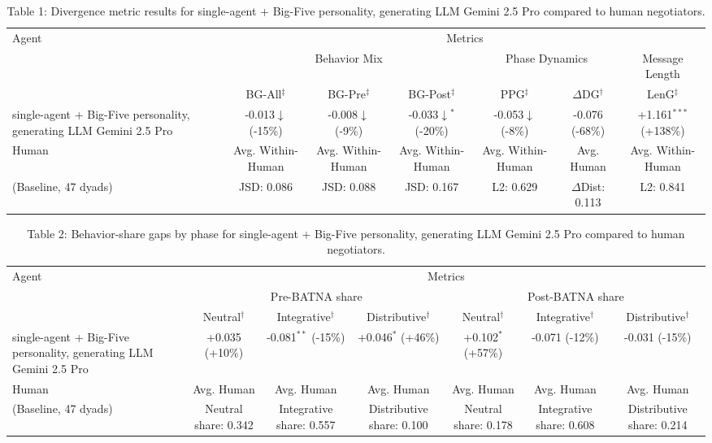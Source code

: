 \begin{table}[t]
\centering
\begin{tabular}{lcccccc}
\toprule
\multirow{3}{*}{Agent} & \multicolumn{6}{c}{Metrics} \\
\cmidrule(lr){2-7}
 & \multicolumn{3}{c}{Behavior Mix} & \multicolumn{2}{c}{Phase Dynamics} & \multicolumn{1}{c}{Message Length} \\
\cmidrule(lr){2-4} \cmidrule(lr){5-6} \cmidrule(lr){7-7}
 & BG-All$^\ddagger$ & BG-Pre$^\ddagger$ & BG-Post$^\ddagger$ & PPG$^\ddagger$ & $\Delta$DG$^\dagger$ & LenG$^\ddagger$ \\
\midrule
single-agent + Big-Five personality, generating LLM Gemini 2.5 Pro & -0.013$\downarrow$ (-15\%) & -0.008$\downarrow$ (-9\%) & -0.033$\downarrow$$^{*}$ (-20\%) & -0.053$\downarrow$ (-8\%) & -0.076 (-68\%) & +1.161$^{***}$ (+138\%) \\
\midrule
Human & Avg. Within-Human & Avg. Within-Human & Avg. Within-Human & Avg. Within-Human & Avg. Human & Avg. Within-Human \\
(Baseline, 47 dyads) & JSD: 0.086 & JSD: 0.088 & JSD: 0.167 & L2: 0.629 & $\Delta$Dist: 0.113 & L2: 0.841 \\
\bottomrule
\end{tabular}
\caption{Table 1: Divergence metric results for single-agent + Big-Five personality, generating LLM Gemini 2.5 Pro compared to human negotiators.}
\end{table}

\begin{table}[t]
\centering
\begin{tabular}{lcccccc}
\toprule
\multirow{3}{*}{Agent} & \multicolumn{6}{c}{Metrics} \\
\cmidrule(lr){2-7}
 & \multicolumn{3}{c}{Pre-BATNA share} & \multicolumn{3}{c}{Post-BATNA share} \\
\cmidrule(lr){2-4} \cmidrule(lr){5-7}
 & Neutral$^\dagger$ & Integrative$^\dagger$ & Distributive$^\dagger$ & Neutral$^\dagger$ & Integrative$^\dagger$ & Distributive$^\dagger$ \\
\midrule
single-agent + Big-Five personality, generating LLM Gemini 2.5 Pro & +0.035 (+10\%) & -0.081$^{**}$ (-15\%) & +0.046$^{*}$ (+46\%) & +0.102$^{*}$ (+57\%) & -0.071 (-12\%) & -0.031 (-15\%) \\
\midrule
Human & Avg. Human & Avg. Human & Avg. Human & Avg. Human & Avg. Human & Avg. Human \\
(Baseline, 47 dyads) & Neutral share: 0.342 & Integrative share: 0.557 & Distributive share: 0.100 & Neutral share: 0.178 & Integrative share: 0.608 & Distributive share: 0.214 \\
\bottomrule
\end{tabular}
\caption{Table 2: Behavior-share gaps by phase for single-agent + Big-Five personality, generating LLM Gemini 2.5 Pro compared to human negotiators.}
\end{table}
